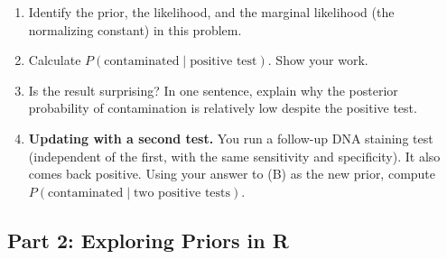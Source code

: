 \documentclass{article}
\begin{document}
\begin{enumerate}[label={\bfseries (\Alph*)},itemsep=.6em]
	\item Identify the prior, the likelihood, and the marginal likelihood (the normalizing constant) in this problem. \\[3em]
	\item Calculate $P(\text{contaminated} \mid \text{positive test})$. Show your work. \\
	\newpage
	\item Is the result surprising? In one sentence, explain why the posterior probability of contamination is relatively low despite the positive test. \\[3em]
	\item \textbf{Updating with a second test.} You run a follow-up DNA staining test (independent of the first, with the same sensitivity and specificity). It also comes back positive.
	Using your answer to (B) as the new prior, compute $P(\text{contaminated} \mid \text{two positive tests})$.
	\\[5em]
\end{enumerate}

\subsection*{Part 2: Exploring Priors in R}
\end{document}
